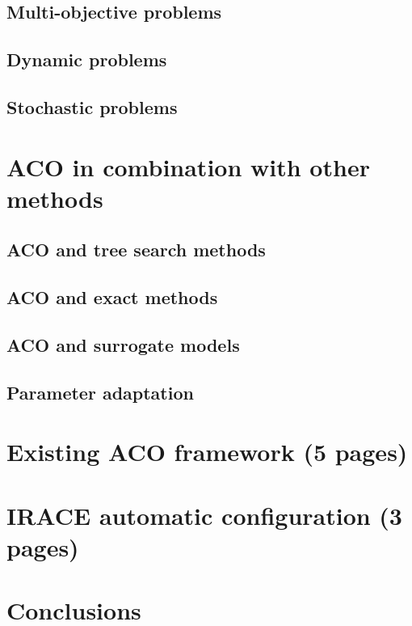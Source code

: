 \documentclass[12pt]{article}
\begin{document}
\subsection{Multi-objective problems}

\subsection{Dynamic problems}

\subsection{Stochastic problems}

\section{ACO in combination with other methods}

\subsection{ACO and tree search methods}

\subsection{ACO and exact methods}

\subsection{ACO and surrogate models}

\subsection{Parameter adaptation}

\section{Existing ACO framework (5 pages)}

\section{IRACE automatic configuration (3 pages)}

\section{Conclusions}

\begin{thebibliography}{1}

\end{thebibliography}
\end{document}
